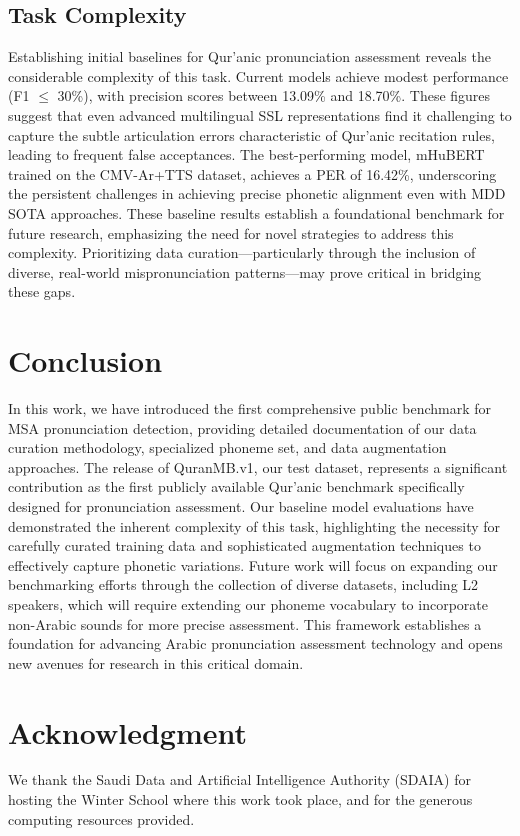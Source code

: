 \documentclass{Interspeech}
\begin{document}
\subsection{Task Complexity} Establishing initial baselines for Qur'anic pronunciation assessment reveals the considerable complexity of this task. Current models achieve modest performance (F1 $\leq$ 30\%), with precision scores between 13.09\% and 18.70\%. These figures suggest that even advanced multilingual SSL representations find it challenging to capture the subtle articulation errors characteristic of Qur'anic recitation rules, leading to frequent false acceptances. The best-performing model, mHuBERT trained on the CMV-Ar+TTS dataset, achieves a PER of 16.42\%, underscoring the persistent challenges in achieving precise phonetic alignment even with MDD SOTA approaches. These baseline results establish a foundational benchmark for future research, emphasizing the need for novel strategies to address this complexity. Prioritizing data curation—particularly through the inclusion of diverse, real-world mispronunciation patterns—may prove critical in bridging these gaps.

\section{Conclusion}
In this work, we have introduced the first comprehensive public benchmark for MSA pronunciation detection, providing detailed documentation of our data curation methodology, specialized phoneme set, and data augmentation approaches. The release of QuranMB.v1, our test dataset, represents a significant contribution as the first publicly available Qur'anic benchmark specifically designed for pronunciation assessment. Our baseline model evaluations have demonstrated the inherent complexity of this task, highlighting the necessity for carefully curated training data and sophisticated augmentation techniques to effectively capture phonetic variations. Future work will focus on expanding our benchmarking efforts through the collection of diverse datasets, including L2 speakers, which will require extending our phoneme vocabulary to incorporate non-Arabic sounds for more precise assessment. This framework establishes a foundation for advancing Arabic pronunciation assessment technology and opens new avenues for research in this critical domain.

\section{Acknowledgment}
We thank the Saudi Data and Artificial Intelligence Authority (SDAIA) for hosting the Winter School where this work took place, and for the generous computing resources provided.



\end{document}
